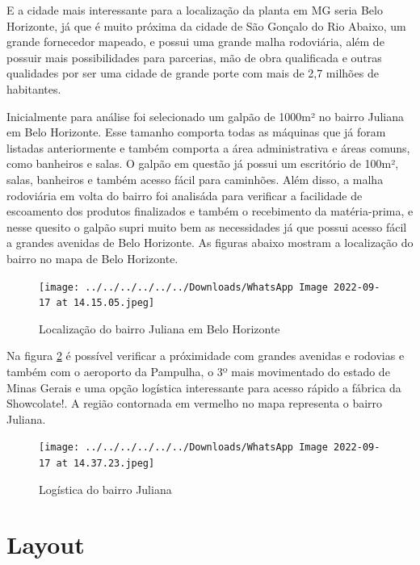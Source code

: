 \documentclass[
	12pt,				%
	openright,			%
	oneside,			%
	a4paper,			%
	english,			%
	french,				%
	spanish,			%
	brazil				%
	]{abntex2}
\begin{document}
E a cidade mais interessante para a localização da planta em MG seria Belo Horizonte, já que é muito próxima da cidade de São Gonçalo do Rio Abaixo, um grande fornecedor mapeado, e possui uma grande malha rodoviária, além de possuir mais possibilidades para parcerias, mão de obra qualificada e outras qualidades por ser uma cidade  de grande porte com mais de 2,7 milhões de habitantes. 

Inicialmente para análise foi selecionado um galpão de 1000m² no bairro Juliana em Belo Horizonte. Esse tamanho comporta todas as máquinas que já foram listadas anteriormente e também comporta a área administrativa e áreas comuns, como banheiros e salas. O galpão em questão já possui um escritório de 100m², salas, banheiros e também acesso fácil para caminhões. Além disso, a malha rodoviária em volta do bairro foi analisáda para verificar a facilidade de escoamento dos produtos finalizados e também o recebimento da matéria-prima, e nesse quesito o galpão supri muito bem as necessidades já que possui acesso fácil a grandes avenidas de Belo Horizonte. As figuras abaixo mostram a localização do bairro no mapa de Belo Horizonte.


\begin{figure}[H]
\begin{center}
\caption{Localização do bairro Juliana em Belo Horizonte}
\texttt{[image: ../../../../../../Downloads/WhatsApp Image 2022-09-17 at 14.15.05.jpeg]} 
\label{loca1}
\end{center}
\end{figure}

Na figura \ref{loca2} é possível verificar a próximidade com grandes avenidas e rodovias e também com o aeroporto da Pampulha, o 3º mais movimentado do estado de Minas Gerais e uma opção logística interessante para acesso rápido a fábrica da Showcolate!. A região contornada em vermelho no mapa representa o bairro Juliana.


\begin{figure}[H]
\begin{center}
\caption{Logística do bairro Juliana}
\texttt{[image: ../../../../../../Downloads/WhatsApp Image 2022-09-17 at 14.37.23.jpeg]} 
\label{loca2}
\end{center}
\end{figure}

\newpage
\chapter{Layout}
\end{document}
